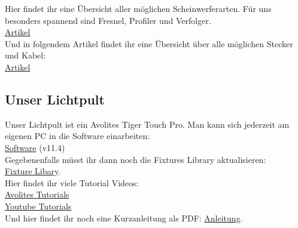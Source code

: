 \noindent Hier findet ihr eine Übersicht aller möglichen Scheinwerferarten. Für uns besonders spannend sind Fresnel, Profiler und Verfolger.\\
\href{https://wiki.production-partner.de/licht/welches-licht-macht-welcher-scheinwerfer/}{Artikel}\\

\noindent Und in folgendem Artikel findet ihr eine Übersicht über alle möglichen Stecker und Kabel: \\
\href{https://www.stage223.com/wissen/steckerarten-fuer-strom-in-der-veranstaltungstechnik-what-the-plug/}{Artikel}

\subsection{Unser Lichtpult}
Unser Lichtpult ist ein Avolites Tiger Touch Pro. Man kann sich jederzeit am eigenen PC in die Software einarbeiten:\\
\href{https://web3.avolites.com/software/downloads/titan-pc-suite}{Software} (v11.4)\\

\noindent Gegebenenfalls müsst ihr dann noch die Fixtures Library aktualisieren:\\
\href{https://personalities.avolites.com/PersonalityFiles/Downloads/TitanFixtureLibraryV10.exe}{Fixture Libary}.\\

\noindent Hier findet ihr viele Tutorial Videos:\\
\href{https://www.avolites.com/support/tutorials-guides/}{Avolites Tutorials}\\
\href{URL}{Youtube Tutorials}\\

\noindent Und hier findet ihr noch eine Kurzanleitung als PDF: \href{https://web3.avolites.com/Portals/0/downloads/manuals/titanone/Titan%20One%20Quick%20Start%20Guide.pdf?ver=2019-06-06-150613-817}{Anleitung}.